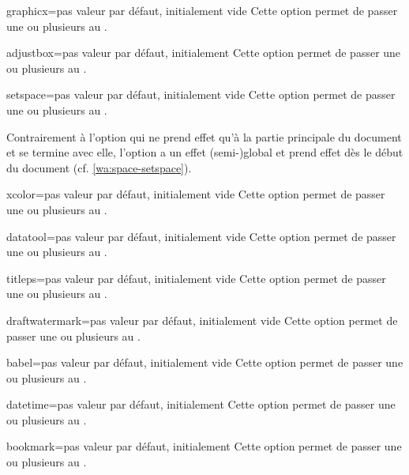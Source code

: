 \begin{docKey}{graphicx}{=}{pas valeur par défaut,
    initialement vide}
  Cette option permet de passer une ou plusieurs  au
  .
\end{docKey}
\begin{docKey}{adjustbox}{=}{pas valeur par défaut,
    initialement }
  Cette option permet de passer une ou plusieurs  au
  .
\end{docKey}
\begin{docKey}{setspace}{=}{pas valeur par défaut,
    initialement vide}
  Cette option permet de passer une ou plusieurs  au
  .

  Contrairement à l'option  qui ne prend effet qu'à la partie
  principale du document et se termine avec elle, l'option 
  a un effet (semi-)global et prend effet dès le début du document
  (cf. \vref{wa:space-setspace}).
\end{docKey}
\begin{docKey}{xcolor}{=}{pas valeur par défaut,
    initialement vide}
  Cette option permet de passer une ou plusieurs  au
  .
\end{docKey}
\begin{docKey}{datatool}{=}{pas valeur par défaut,
    initialement vide}
  Cette option permet de passer une ou plusieurs  au
  .
\end{docKey}
\begin{docKey}{titleps}{=}{pas valeur par défaut, initialement
    vide}
  Cette option permet de passer une ou plusieurs  au
  .
\end{docKey}
\begin{docKey}{draftwatermark}{=}{pas valeur par défaut,
    initialement vide}
  Cette option permet de passer une ou plusieurs  au
  .
\end{docKey}
\begin{docKey}{babel}{=}{pas valeur par défaut,
    initialement vide}
  Cette option permet de passer une ou plusieurs  au
  .
\end{docKey}
\begin{docKey}{datetime}{=}{pas valeur par défaut,
    initialement }
  Cette option permet de passer une ou plusieurs  au
  .
\end{docKey}
\begin{docKey}{bookmark}{=}{pas valeur par défaut,
    initialement }
  Cette option permet de passer une ou plusieurs  au
  .
\end{docKey}

